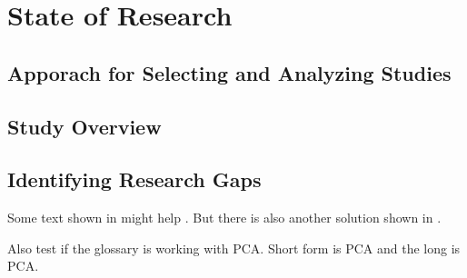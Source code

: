 
\chapter{State of Research}

\section{Apporach for Selecting and Analyzing Studies}

\section{Study Overview}

\section{Identifying Research Gaps}

Some text shown in \cite{Bringhurst12} might help \cite{Tufte01}.
But there is also another solution shown in \cite{Tufte90}.

Also test if the glossary is working with \gls{PCA}.
Short form is \acrshort{PCA} and the long is \acrlong{PCA}.